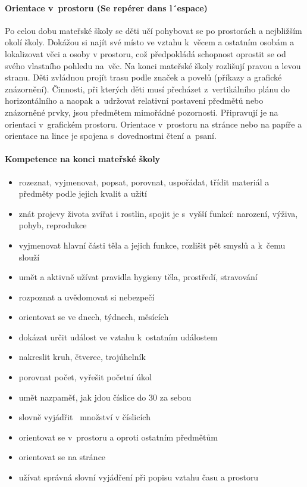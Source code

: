 			\paragraph{Orientace v prostoru (Se repérer dans l´espace)}
				Po celou dobu mateřské školy se děti učí pohybovat se po prostorách a nejbližším okolí školy. Dokážou si najít své místo ve vztahu k věcem a ostatním osobám a lokalizovat věci a osoby v prostoru, což předpokládá schopnost oprostit se od svého vlastního pohledu na věc. Na konci mateřské školy rozlišují pravou a levou stranu. Děti zvládnou projít trasu podle značek a povelů (příkazy a grafické znázornění).
				Činnosti, při kterých děti musí přecházet z vertikálního plánu do horizontálního a naopak a udržovat relativní postavení předmětů nebo znázorněné prvky, jsou předmětem mimořádné pozornosti. Připravují je na orientaci v grafickém prostoru. Orientace v prostoru na stránce nebo na papíře a orientace na lince je spojena s dovednostmi čtení a psaní. 
			\paragraph{Kompetence na konci mateřské školy}
				\begin{itemize}
				\item rozeznat, vyjmenovat, popsat, porovnat, uspořádat, třídit materiál a předměty podle jejich kvalit a užití
				\item znát projevy života zvířat i rostlin, spojit je s vyšší funkcí: narození, výživa, pohyb, reprodukce
				\item vyjmenovat hlavní části těla a jejich funkce, rozlišit pět smyslů a k čemu slouží
				\item umět a aktivně užívat pravidla hygieny těla, prostředí, stravování
				\item rozpoznat a uvědomovat si nebezpečí
				\item orientovat se ve dnech, týdnech, měsících
				\item dokázat určit událost ve vztahu k ostatním událostem
				\item nakreslit kruh, čtverec, trojúhelník
				\item porovnat počet, vyřešit početní úkol
				\item umět nazpaměť, jak jdou číslice do 30 za sebou 
				\item slovně vyjádřit  množství v číslicích 
				\item orientovat se v prostoru a oproti ostatním předmětům
				\item orientovat se na stránce
				\item užívat správná slovní vyjádření při popisu vztahu času a prostoru
				\end{itemize}

